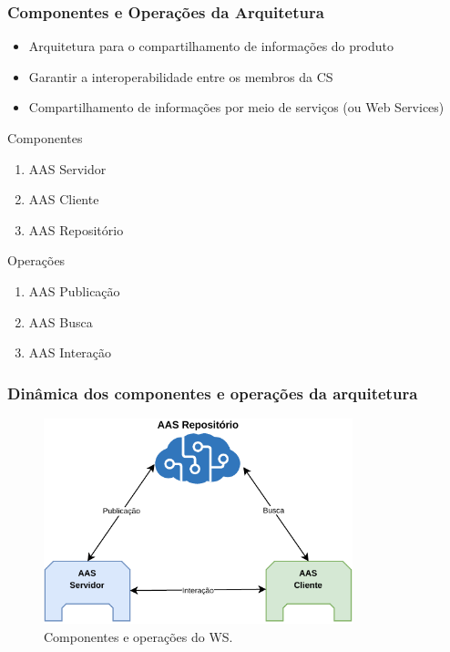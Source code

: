 \documentclass[10pt]{beamer}
\begin{document}
\begin{frame}
	\frametitle{Componentes e Operações da Arquitetura}
	
	\begin{itemize}
		\item Arquitetura para o compartilhamento de informações do produto
		\item Garantir a interoperabilidade entre os membros da CS
		\item Compartilhamento de informações por meio de serviços (ou Web Services)
	\end{itemize}

	Componentes
	\begin{enumerate}
		\item AAS Servidor
		\item AAS Cliente
		\item AAS Repositório
	\end{enumerate}

	Operações
	\begin{enumerate}
		\item AAS Publicação
		\item AAS Busca
		\item AAS Interação
	\end{enumerate}
	
\end{frame}
\begin{frame}
	\frametitle{Dinâmica dos componentes e operações da arquitetura}
	
	\begin{figure}[htb]
		\centering
		\caption{Componentes e operações do WS.}
		\label{fig:aas-ws}
		\includegraphics[width=0.8\textwidth]{aas-ws}
	\end{figure}
	
\end{frame}
\end{document}
